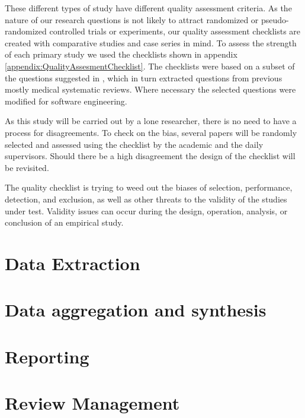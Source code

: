These different types of study have different quality assessment criteria.  
As the nature of our research questions is not likely to attract randomized or pseudo-randomized controlled trials or experiments, our quality assessment checklists are created with comparative studies and case series in mind.
To assess the strength of each primary study we used the checklists shown in appendix \ref{appendix:QualityAssesmentChecklist}.
The checklists were based on a subset of the questions suggested in \cite{keele2007guidelines}, which in turn extracted questions from previous mostly medical systematic reviews.
Where necessary the selected questions were modified for software engineering.

As this study will be carried out by a lone researcher, there is no need to have a process for disagreements.
To check on the bias, several papers will be randomly selected and assessed using the checklist by the academic and the daily supervisors.
Should there be a high disagreement the design of the checklist will be revisited.

The quality checklist is trying to weed out the biases of selection, performance, detection, and exclusion, as well as other threats to the validity of the studies under test.
Validity issues can occur during the design, operation, analysis, or conclusion of an empirical study.

\section{Data Extraction}

\section{Data aggregation and synthesis}

\section{Reporting}

\section{Review Management}
